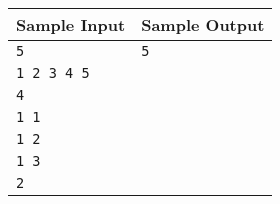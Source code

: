 \documentclass{article}
\begin{document}
\begin{tabular}{l|l}
    \hline
    \hline
    Sample Input & Sample Output \\
    \hline
    \verb+5+ & \verb+5+ \\
    \verb+1 2 3 4 5+ & \verb++ \\
    \verb+4+ & \verb++ \\
    \verb+1 1+ & \verb++ \\
    \verb+1 2+ & \verb++ \\
    \verb+1 3+ & \verb++ \\
    \verb+2+ & \verb++ \\
    \hline
\end{tabular}
\end{document}
